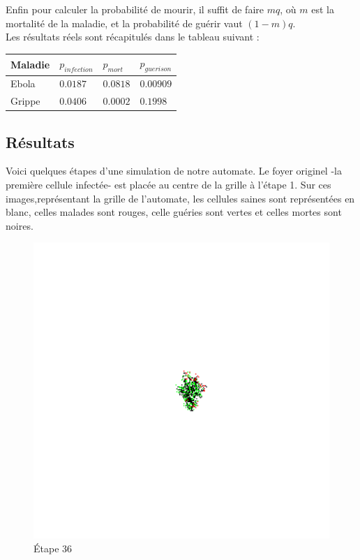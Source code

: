 \documentclass{article}
\begin{document}
Enfin pour calculer la probabilité de mourir, il suffit de faire $mq$, où $m$ est la mortalité de la maladie, et la probabilité de guérir vaut $(1-m)q$. \\
Les résultats réels sont récapitulés dans le tableau suivant :

\begin{tabular} {| p{2cm} | p{2cm}| p{2cm} | p{2cm} |}
	\hline
	Maladie & $p_{infection}$ & $p_{mort}$ & $p_{guerison}$ \\ \hline
	Ebola & $0.0187$ & $0.0818$ & $0.00909$ \\ \hline
	Grippe & $0.0406$ & $0.0002$ & $0.1998$ \\
	\hline
\end{tabular}

\subsection{Résultats}

Voici quelques étapes d'une simulation de notre automate. Le foyer originel -la première cellule infectée- est placée au centre de la grille à l'étape 1. Sur ces images,représentant la grille de l'automate, les cellules saines sont représentées en blanc, celles malades sont rouges, celle guéries sont vertes et celles mortes sont noires.

\begin{figure}[H]
\centering
\includegraphics[scale=0.22]{../images/Frame-36.png}
\caption{Étape 36}
\end{figure}
\end{document}
